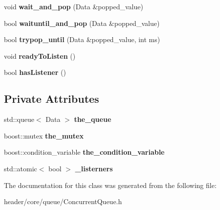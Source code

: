 \begin{DoxyCompactItemize}
\mbox{\label{classcore_1_1queue_1_1_concurrent_queue_ab20318fc7babd0835da628565e835964}} 
void {\bfseries wait\+\_\+and\+\_\+pop} (Data \&popped\+\_\+value)
\item 
\mbox{\label{classcore_1_1queue_1_1_concurrent_queue_a3db1b9c9742df9f0b9a12e41da291c9c}} 
bool {\bfseries waituntil\+\_\+and\+\_\+pop} (Data \&popped\+\_\+value)
\item 
\mbox{\label{classcore_1_1queue_1_1_concurrent_queue_acfe4c69c42669217b08a21cf18489731}} 
bool {\bfseries trypop\+\_\+until} (Data \&popped\+\_\+value, int ms)
\item 
\mbox{\label{classcore_1_1queue_1_1_concurrent_queue_a27fc1149494485b229ddc820a5c760b3}} 
void {\bfseries ready\+To\+Listen} ()
\item 
\mbox{\label{classcore_1_1queue_1_1_concurrent_queue_a219de9530ac8efde9ef63f7b0234d2f6}} 
bool {\bfseries has\+Listener} ()
\end{DoxyCompactItemize}
\subsection*{Private Attributes}
\begin{DoxyCompactItemize}
\item 
\mbox{\label{classcore_1_1queue_1_1_concurrent_queue_a8dd62094bc299b583458dc117e97f9b5}} 
std\+::queue$<$ Data $>$ {\bfseries the\+\_\+queue}
\item 
\mbox{\label{classcore_1_1queue_1_1_concurrent_queue_a097c58c765fc7c3788731979a3ffae46}} 
boost\+::mutex {\bfseries the\+\_\+mutex}
\item 
\mbox{\label{classcore_1_1queue_1_1_concurrent_queue_aa3c01e5a3d42c8b10700b8436207f103}} 
boost\+::condition\+\_\+variable {\bfseries the\+\_\+condition\+\_\+variable}
\item 
\mbox{\label{classcore_1_1queue_1_1_concurrent_queue_a5a4e86fd912a13899961d3309f414286}} 
std\+::atomic$<$ bool $>$ {\bfseries \+\_\+listerners}
\end{DoxyCompactItemize}


The documentation for this class was generated from the following file\+:\begin{DoxyCompactItemize}
\item 
header/core/queue/Concurrent\+Queue.\+h\end{DoxyCompactItemize}
